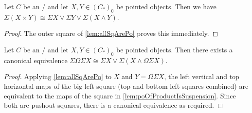 \begin{corollary}
    Let $C$ be an \inftytop/ and let $X,Y\in \left(C_*\right)_0$ be pointed objects. 
    Then we have $\Sigma\left(X\times Y\right)\cong\Sigma X\vee\Sigma Y\vee\Sigma\left(X\wedge Y\right)$.
    \begin{proof}
        The outer square of \cref{lem:allSqArePo} proves this immediately. 
    \end{proof}
\end{corollary}
\begin{corollary}
    Let $C$ be an \inftytop/ and let $X,Y\in \left(C_*\right)_0$ be pointed objects. 
    Then there exists a canonical equivalence $\Sigma\Omega\Sigma X\cong\Sigma X\vee\Sigma\left(X\wedge\Omega\Sigma X\right)$.
    \begin{proof}
        Applying \cref{lem:allSqArePo} to $X$ and $Y=\Omega\Sigma X$, the left vertical and top horizontal maps of the big left square (top and bottom left squares combined) are equivalent to the maps of the square in \cref{lem:poOfProductIsSuspension}.
        Since both are pushout squares, there is a canonical equivalence as required.
    \end{proof}
\end{corollary}
